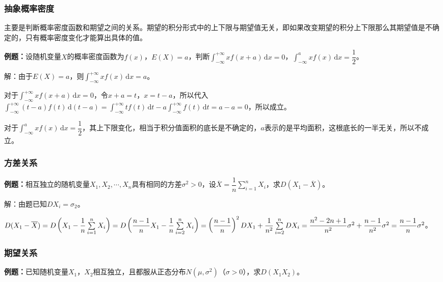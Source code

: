 \subsubsection{抽象概率密度}

主要是判断概率密度函数和期望之间的关系。期望的积分形式中的上下限与期望值无关，即如果改变期望的积分上下限那么其期望值是不确定的，只有概率密度变化才能算出具体的值。

\textbf{例题：}设随机变量$X$的概率密度函数为$f(x)$，$E(X)=a$，判断$\int_{-\infty}^{+\infty}xf(x+a)\,\textrm{d}x=0$，$\int_{-\infty}^axf(x)\,\textrm{d}x=\dfrac{1}{2}$。

解：由于$E(X)=a$，则$\int_{-\infty}^{+\infty}xf(x)\,\textrm{d}x=a$。

对于$\int_{-\infty}^{+\infty}xf(x+a)\,\textrm{d}x=0$，令$x+a=t$，$x=t-a$，所以代入$\int_{-\infty}^{+\infty}(t-a)f(t)\,\textrm{d}(t-a)=\int_{-\infty}^{+\infty}tf(t)\,\textrm{d}t-a\int_{-\infty}^{+\infty}f(t)\,\textrm{d}t=a-a=0$，所以成立。

对于$\int_{-\infty}^axf(x)\,\textrm{d}x=\dfrac{1}{2}$，其上下限变化，相当于积分值面积的底长是不确定的，$a$表示的是平均面积，这根底长的一半无关，所以不成立。

\paragraph{}

\subsubsection{方差关系}

\textbf{例题：}相互独立的随机变量$X_1,X_2,\cdots,X_n$具有相同的方差$\sigma^2>0$，设$\overline{X}=\dfrac{1}{n}\sum\limits_{i=1}^nX_i$，求$D(X_1-\overline{X})$。

解：由题已知$DX_i=\sigma_2$。

$D(X_1-\overline{X})=D\left(X_1-\dfrac{1}{n}\sum\limits_{i=1}^nX_i\right)=D\left(\dfrac{n-1}{n}X_1-\dfrac{1}{n}\sum\limits_{i=2}^nX_i\right)=\left(\dfrac{n-1}{n}\right)^2\\DX_1+\dfrac{1}{n^2}\sum\limits_{i=2}^nDX_i=\dfrac{n^2-2n+1}{n^2}\sigma^2+\dfrac{n-1}{n^2}\sigma^2=\dfrac{n-1}{n}\sigma^2$。

\subsubsection{期望关系}

\textbf{例题：}已知随机变量$X_1$，$X_2$相互独立，且都服从正态分布$N(\mu,\sigma^2)$（$\sigma>0$），求$D(X_1X_2)$。

